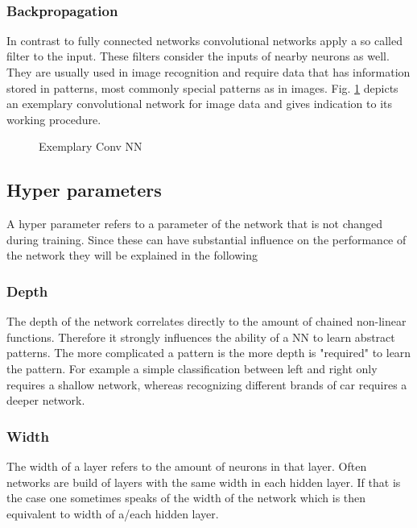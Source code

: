 			\\
			\subsubsection{Backpropagation}
			\label{BackProp}
			\begin{equiation}
				
			\end{equiation}
			
		
			In contrast to fully connected networks convolutional networks apply a so called filter to the input. These filters consider the inputs of nearby neurons as well. They are usually used in image recognition and require data that has information stored in patterns, most commonly special patterns as in images. Fig. \ref{Img_NNConv} depicts an exemplary convolutional network for image data and gives indication to its working procedure.
		
			\begin{figure}
				\caption{Exemplary Conv NN}
				\label{Img_NNConv}
			\end{figure}
		

			
		 
		\subsection{Hyper parameters}
			\label{HyperPar}
			A hyper parameter refers to a parameter of the network that is not changed during training. Since these can have substantial influence on the performance of the network they will be explained in the following
			\subsubsection{Depth}
				The depth of the network correlates directly to the amount of chained non-linear functions. Therefore it strongly influences the ability of a NN to learn abstract patterns. The more complicated a pattern is the more depth is "required" to learn the pattern. For example a simple classification between left and right only requires a shallow network, whereas recognizing different brands of car requires a deeper network.
			\subsubsection{Width}
				The width of a layer refers to the amount of neurons in that layer. Often networks are build of layers with the same width in each hidden layer. If that is the case one sometimes speaks of the width of the network which is then equivalent to width of a/each hidden layer.
